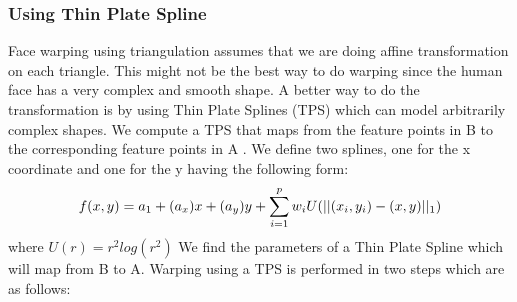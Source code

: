 \documentclass[conference]{IEEEtran}
\begin{document}
\subsubsection{Using Thin Plate Spline}
Face warping using triangulation assumes that we are doing affine transformation on each triangle. This might not be the best way to do warping since the human face has a very complex and smooth shape. A better way to do the transformation is by using Thin Plate Splines (TPS) which can model arbitrarily complex shapes. We compute a TPS that maps from the feature points in B to the corresponding feature points in A . We define two splines, one for the x coordinate and one for the y having the following form:
\begin{equation}
f(x,y) = a_1 + (a_x)x + (a_y)y + \sum_{\mathclap{i=1}}^{p} w_{i}U(||(x_i, y_i) - (x,y)||_1)
\end{equation}
where $U(r) = r^{2}log(r^2)$
We find the parameters of a Thin Plate Spline which will map from B to A. Warping using a TPS is performed in two steps which are as follows:
\end{document}
